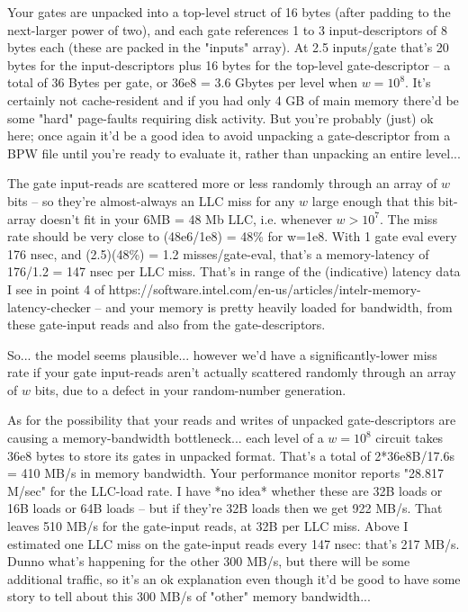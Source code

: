 Your gates are unpacked into a top-level struct of 16 bytes (after padding to the next-larger power of two), and each gate references 1 to 3  input-descriptors of 8 bytes each (these are packed in the "inputs" array).  At 2.5 inputs/gate that's 20 bytes for the input-descriptors plus 16 bytes for the top-level gate-descriptor -- a total of 36 Bytes per gate, or 36e8 = 3.6 Gbytes per level when $w=10^8$.  It's certainly not cache-resident and if you had only 4 GB of main memory there'd be some "hard" page-faults requiring disk activity.  But you're probably (just) ok here; once again it'd be a good idea to avoid unpacking a gate-descriptor from a BPW file until you're ready to evaluate it, rather than unpacking an entire level...

The gate input-reads are scattered more or less randomly through an array of $w$ bits -- so they're almost-always an LLC miss for any $w$ large enough that this bit-array doesn't fit in your 6MB = 48 Mb LLC, i.e. whenever $w > 10^7$.   The miss rate should be very close to (48e6/1e8) = 48\% for w=1e8.   With 1 gate eval every 176 nsec, and (2.5)(48\%) = 1.2 misses/gate-eval, that's a memory-latency of 176/1.2 = 147 nsec per LLC miss.   That's in range of the (indicative) latency data I see in point 4 of https://software.intel.com/en-us/articles/intelr-memory-latency-checker -- and your memory is pretty heavily loaded for bandwidth, from these gate-input reads and also from the gate-descriptors.

So... the model seems plausible... however we'd have a significantly-lower miss rate if your gate input-reads aren't actually scattered randomly through an array of $w$ bits, due to a defect in your random-number generation.

As for the possibility that your reads and writes of unpacked gate-descriptors are causing a memory-bandwidth bottleneck... each level of a $w=10^8$ circuit takes 36e8 bytes to store its gates in unpacked format.  That's a total of 2*36e8B/17.6s = 410 MB/s in memory bandwidth.  Your performance monitor reports "28.817 M/sec" for the LLC-load rate.  I have *no idea* whether these are 32B loads or 16B loads or 64B loads -- but if they're 32B loads then we get 922 MB/s.  That leaves 510 MB/s for the gate-input reads, at 32B per LLC miss.  Above I estimated one LLC miss on the gate-input reads every 147 nsec: that's 217 MB/s.  Dunno what's happening for the other 300 MB/s, but there will be some additional traffic, so it's an ok explanation even though it'd be good to have some story to tell about this 300 MB/s of "other" memory bandwidth...

